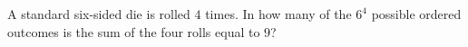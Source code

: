 A standard six-sided die is rolled $4$ times. In how many of the $6^4$ possible ordered outcomes is the sum of the four rolls equal to $9$?
